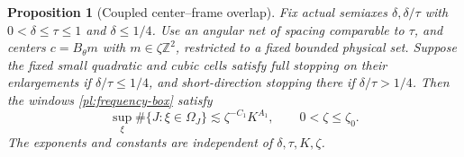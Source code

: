 \documentclass[11pt]{amsart}
\newtheorem{proposition}[theorem]{Proposition}
\theoremstyle{definition}
\theoremstyle{remark}
\numberwithin{equation}{section}
\begin{document}
\begin{proposition}[Coupled center--frame overlap]\label{pl:coupled-overlap}
Fix actual semiaxes $\delta,\delta/\tau$ with $0<\delta\le\tau\le1$ and $\delta\le1/4$. Use an angular net of spacing comparable to $\tau$, and centers $c=B_\theta m$ with $m\in\zeta\mathbb Z^2$, restricted to a fixed bounded physical set. Suppose the fixed small quadratic and cubic cells satisfy full stopping on their enlargements if $\delta/\tau\le1/4$, and short-direction stopping there if $\delta/\tau>1/4$. Then the windows \eqref{pl:frequency-box} satisfy
\begin{equation}\label{pl:overlap-with-mesh}
\sup_\xi\#\{J:\xi\in\Omega_J\}\lesssim \zeta^{-C_1}K^{A_1},
\qquad 0<\zeta\le\zeta_0.
\end{equation}
The exponents and constants are independent of $\delta,\tau,K,\zeta$.
\end{proposition}
\end{document}
